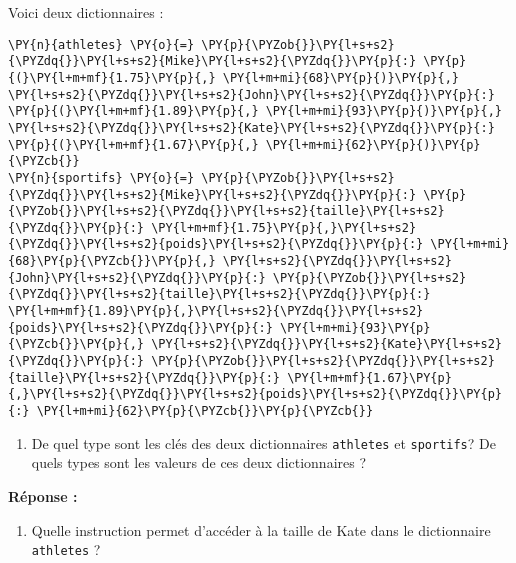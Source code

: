 \documentclass[12pt]{book}
\begin{document}
    Voici deux dictionnaires :

    \begin{tcolorbox}[breakable, size=fbox, boxrule=1pt, pad at break*=1mm,colback=cellbackground, colframe=cellborder]
\begin{Verbatim}[commandchars=\\\{\}]
\PY{n}{athletes} \PY{o}{=} \PY{p}{\PYZob{}}\PY{l+s+s2}{\PYZdq{}}\PY{l+s+s2}{Mike}\PY{l+s+s2}{\PYZdq{}}\PY{p}{:} \PY{p}{(}\PY{l+m+mf}{1.75}\PY{p}{,} \PY{l+m+mi}{68}\PY{p}{)}\PY{p}{,} \PY{l+s+s2}{\PYZdq{}}\PY{l+s+s2}{John}\PY{l+s+s2}{\PYZdq{}}\PY{p}{:} \PY{p}{(}\PY{l+m+mf}{1.89}\PY{p}{,} \PY{l+m+mi}{93}\PY{p}{)}\PY{p}{,} \PY{l+s+s2}{\PYZdq{}}\PY{l+s+s2}{Kate}\PY{l+s+s2}{\PYZdq{}}\PY{p}{:} \PY{p}{(}\PY{l+m+mf}{1.67}\PY{p}{,} \PY{l+m+mi}{62}\PY{p}{)}\PY{p}{\PYZcb{}}
\PY{n}{sportifs} \PY{o}{=} \PY{p}{\PYZob{}}\PY{l+s+s2}{\PYZdq{}}\PY{l+s+s2}{Mike}\PY{l+s+s2}{\PYZdq{}}\PY{p}{:} \PY{p}{\PYZob{}}\PY{l+s+s2}{\PYZdq{}}\PY{l+s+s2}{taille}\PY{l+s+s2}{\PYZdq{}}\PY{p}{:} \PY{l+m+mf}{1.75}\PY{p}{,}\PY{l+s+s2}{\PYZdq{}}\PY{l+s+s2}{poids}\PY{l+s+s2}{\PYZdq{}}\PY{p}{:} \PY{l+m+mi}{68}\PY{p}{\PYZcb{}}\PY{p}{,} \PY{l+s+s2}{\PYZdq{}}\PY{l+s+s2}{John}\PY{l+s+s2}{\PYZdq{}}\PY{p}{:} \PY{p}{\PYZob{}}\PY{l+s+s2}{\PYZdq{}}\PY{l+s+s2}{taille}\PY{l+s+s2}{\PYZdq{}}\PY{p}{:} \PY{l+m+mf}{1.89}\PY{p}{,}\PY{l+s+s2}{\PYZdq{}}\PY{l+s+s2}{poids}\PY{l+s+s2}{\PYZdq{}}\PY{p}{:} \PY{l+m+mi}{93}\PY{p}{\PYZcb{}}\PY{p}{,} \PY{l+s+s2}{\PYZdq{}}\PY{l+s+s2}{Kate}\PY{l+s+s2}{\PYZdq{}}\PY{p}{:} \PY{p}{\PYZob{}}\PY{l+s+s2}{\PYZdq{}}\PY{l+s+s2}{taille}\PY{l+s+s2}{\PYZdq{}}\PY{p}{:} \PY{l+m+mf}{1.67}\PY{p}{,}\PY{l+s+s2}{\PYZdq{}}\PY{l+s+s2}{poids}\PY{l+s+s2}{\PYZdq{}}\PY{p}{:} \PY{l+m+mi}{62}\PY{p}{\PYZcb{}}\PY{p}{\PYZcb{}}
\end{Verbatim}
\end{tcolorbox}

    \begin{enumerate}
\def\labelenumi{\arabic{enumi}.}
\tightlist
\item
  De quel type sont les clés des deux dictionnaires \texttt{athletes} et
  \texttt{sportifs}? De quels types sont les valeurs de ces deux
  dictionnaires ?
\end{enumerate}

    \textbf{Réponse :}

    \begin{enumerate}
\def\labelenumi{\arabic{enumi}.}
\setcounter{enumi}{1}
\tightlist
\item
  Quelle instruction permet d'accéder à la taille de Kate dans le
  dictionnaire \texttt{athletes} ?
\end{enumerate}
\end{document}
